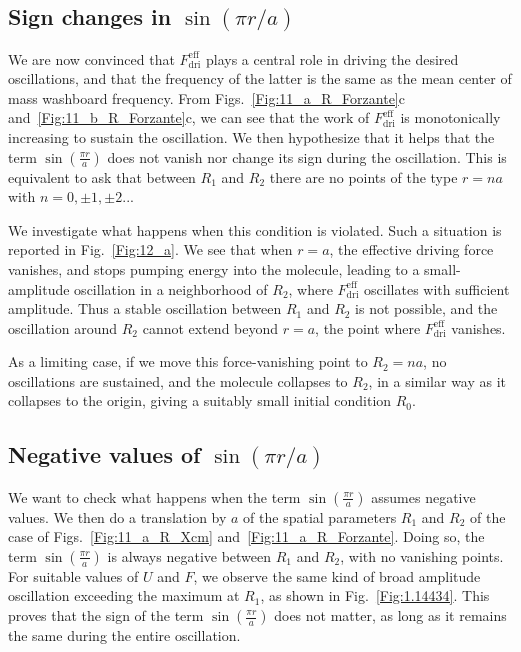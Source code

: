 \subsection{Sign changes in $\sin(\pi r /a)$}
We are now convinced that $F_{\text{dri}}^{\text{eff}}$ plays a central role in driving the desired oscillations, and that the frequency of the latter is the same as the mean center of mass washboard frequency. From Figs.~\ref{Fig:11_a_R_Forzante}c and~\ref{Fig:11_b_R_Forzante}c, we can see that the work of $F_{\text{dri}}^{\text{eff}}$ is  monotonically increasing to sustain the oscillation. We then hypothesize that it helps that the term $\sin\left(\frac{\pi r}{a}\right)$ does not vanish nor change its sign during the oscillation. This is equivalent to ask that between $R_1$ and $R_2$ there are no points of the type $r = na$ with $n = 0, \pm1, \pm2 ...$

We investigate what happens when this condition is violated. Such a situation is reported in Fig.~\ref{Fig:12_a}. We see that when $r=a$, the effective driving force vanishes, and stops pumping energy into the molecule, leading to a small-amplitude oscillation in a neighborhood of $R_2$, where $F_{\text{dri}}^{\text{eff}}$ oscillates with sufficient amplitude. Thus a stable oscillation between $R_1$ and $R_2$ is not possible, and the oscillation around $R_2$ cannot extend beyond $r=a$, the point where $F_{\text{dri}}^{\text{eff}}$ vanishes.

As a limiting case, if we move this force-vanishing point to $R_2 = na$, no oscillations are sustained, and the molecule collapses to $R_2$, in a similar way as it collapses to the origin, giving a suitably small initial condition $R_0$. 

\subsection{Negative values of $\sin(\pi r /a)$}
We want to check what happens when the term $\sin\left(\frac{\pi r}{a}\right)$ assumes negative values. We then do a translation by $a$ of the spatial parameters $R_1$ and $R_2$ of the case of Figs.~\ref{Fig:11_a_R_Xcm} and~\ref{Fig:11_a_R_Forzante}. Doing so, the term $\sin\left(\frac{\pi r}{a}\right)$ is always negative between $R_1$ and $R_2$, with no vanishing points. For suitable values of $U$ and $F$, we observe the same kind of broad amplitude oscillation exceeding the maximum at $R_1$, as shown in Fig.~\ref{Fig:1.14434}. This proves that the sign of the term $\sin\left(\frac{\pi r}{a}\right)$ does not matter, as long as it remains the same during the entire oscillation. 

